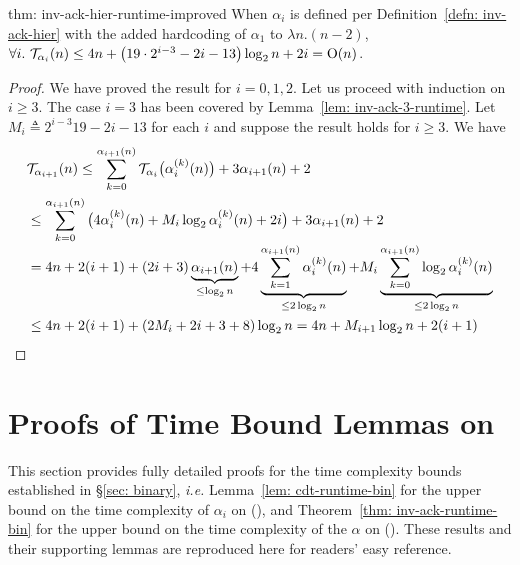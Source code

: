 \begin{usethmcounterof}{thm: inv-ack-hier-runtime-improved}
	When $\alpha_i$ is defined per Definition~\ref{defn: inv-ack-hier} with the added hardcoding of $\alpha_1$ to $\lambda n. (n - 2)$, $\forall i.~\mathcal{T}_{\alpha_i}(n) \le 4n + \left(19\cdot 2^{i-3} - 2i - 13\right)\log_2n + 2i = \text{O}(n)$.
\end{usethmcounterof}

\begin{proof}
	We have proved the result for $i = 0, 1, 2$. Let us proceed with induction on $i\ge 3$. The case $i = 3$ has been covered by Lemma~\ref{lem: inv-ack-3-runtime}. Let $M_i \triangleq 2^{i-3}19 - 2i - 13$ for each $i$ and suppose the result holds for $i\ge 3$. We have
	\begin{equation*}
	\begin{aligned}
	& \mathcal{T}_{\alpha_{i+1}}(n) \le \sum_{k=0}^{\alpha_{i+1}(n)} \mathcal{T}_{\alpha_i}\big(\alpha_i^{(k)}(n)\big) + 3\alpha_{i+1}(n) + 2 \\
	& \le \sum_{k=0}^{\alpha_{i+1}(n)}\big(4\alpha_i^{(k)}(n) + M_i\log_2\alpha_i^{(k)}(n) + 2i \big) + 3\alpha_{i+1}(n) + 2 \\[-3pt]
  & = 4n + 2(i+1) + (2i + 3)\underbrace{\alpha_{i+1}(n)}_{\le \log_2n} + 4\underbrace{\sum_{k=1}^{\alpha_{i+1}(n)}\alpha_i^{(k)}(n)}_{\le 2\log_2n} + M_i\underbrace{\sum_{k=0}^{\alpha_{i+1}(n)}\log_2\alpha_i^{(k)}(n)}_{\le 2\log_2n} \\
	& \le 4n + 2(i+1) + (2M_i + 2i + 3 + 8)\log_2n
	= 4n + M_{i+1}\log_2n + 2(i+1)
  \end{aligned}
	\end{equation*}
\end{proof}

\section{Proofs of Time Bound Lemmas on }
\label{apx:time_analysis_bin}

\renewcommand{\Tleb}{\runtime_{\li{N.leb}}}
\renewcommand{\Tsucc}{\runtime_{\li{N.succ}}}

This section provides fully detailed proofs for the time complexity bounds established in \S\ref{sec: binary},
\emph{i.e.} Lemma~\ref{lem: cdt-runtime-bin} for the upper bound on the time complexity of $\alpha_i$ on  (),
and Theorem~\ref{thm: inv-ack-runtime-bin} for the upper bound on the time complexity of the $\alpha$ on  ().
These results and their supporting lemmas are reproduced here for readers' easy reference.

